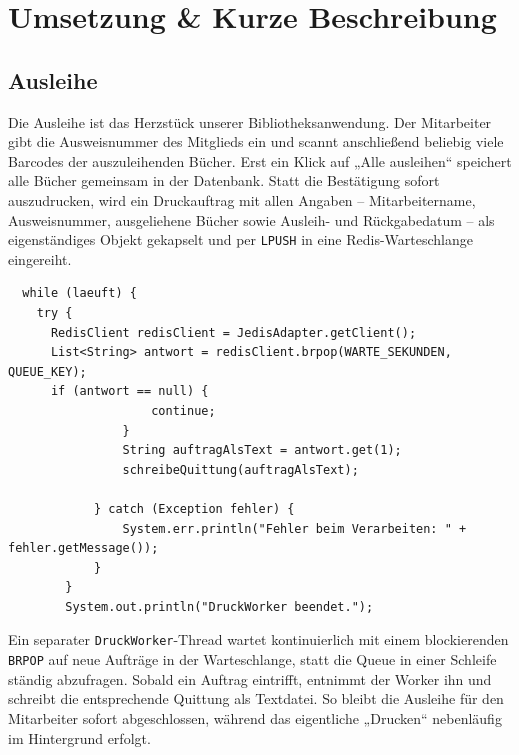 \section{Umsetzung \& Kurze Beschreibung}
\subsection{Ausleihe}
Die Ausleihe ist das Herzstück unserer Bibliotheksanwendung. Der Mitarbeiter gibt die Ausweisnummer des Mitglieds ein und scannt anschließend beliebig viele Barcodes der auszuleihenden Bücher. Erst ein Klick auf „Alle ausleihen“ speichert alle Bücher gemeinsam in der Datenbank.
Statt die Bestätigung sofort auszudrucken, wird ein Druckauftrag mit allen Angaben – Mitarbeitername, Ausweisnummer, ausgeliehene Bücher sowie Ausleih- und Rückgabedatum – als eigenständiges Objekt gekapselt und per \texttt{LPUSH} in eine Redis-Warteschlange eingereiht.
\begin{verbatim}
  while (laeuft) {
    try {
      RedisClient redisClient = JedisAdapter.getClient();
      List<String> antwort = redisClient.brpop(WARTE_SEKUNDEN, QUEUE_KEY);
      if (antwort == null) {
                    continue;
                }
                String auftragAlsText = antwort.get(1);
                schreibeQuittung(auftragAlsText);

            } catch (Exception fehler) {
                System.err.println("Fehler beim Verarbeiten: " + fehler.getMessage());
            }
        }
        System.out.println("DruckWorker beendet.");
\end{verbatim}
Ein separater \texttt{DruckWorker}-Thread wartet kontinuierlich mit einem blockierenden \texttt{BRPOP} auf neue Aufträge in der Warteschlange, statt die Queue in einer Schleife ständig abzufragen. Sobald ein Auftrag eintrifft, entnimmt der Worker ihn und schreibt die entsprechende Quittung als Textdatei. So bleibt die Ausleihe für den Mitarbeiter sofort abgeschlossen, während das eigentliche „Drucken“ nebenläufig im Hintergrund erfolgt.
